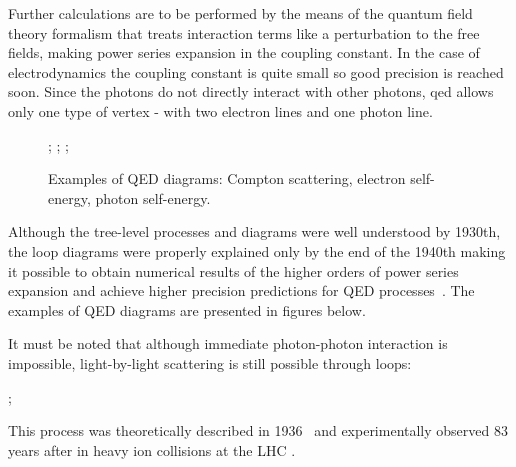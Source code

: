 Further calculations are to be performed by the means of the quantum field theory formalism that treats interaction terms like a perturbation to the free fields, making power series expansion in the coupling constant. In the case of electrodynamics the coupling constant is quite small so good precision is reached soon. Since the photons do not directly interact with other photons, \gls{qed} allows only one type of vertex - with two electron lines and one photon line. 

\begin{figure}
\label{fig::qed}
\centering
{};
;
;
\caption{Examples of QED diagrams: Compton scattering, electron self-energy, photon self-energy.}
\end{figure}
Although the tree-level processes and diagrams were well understood by 1930th, the loop diagrams were properly explained only by the end of the 1940th making it possible to obtain numerical results of the higher orders of power series expansion and achieve higher precision predictions for QED processes~\cite{Schwinger_polariz,Schwinger_covar,Feynman_math,Feynman_positrons,Feynman_spacetime,Tomonaga,Dyson_all,Dyson_smatr}. The examples of QED diagrams are presented in figures below.

It must be noted that although immediate photon-photon interaction is impossible, light-by-light scattering is still possible through loops:\\

\begin{center}

;\\
\end{center}
This process was theoretically described in 1936~\cite{lbl_th} and experimentally observed 83 years after in heavy ion collisions at the LHC \cite{lbl_exp}.
